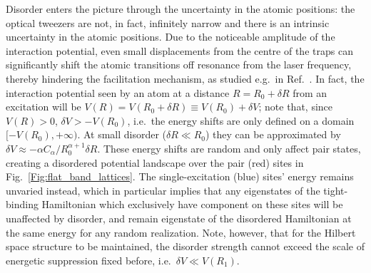 \documentclass[prl,aps,twocolumn,showpacs,superscriptaddress,longbibliography]{revtex4-1}
\begin{document}
Disorder enters the picture through the uncertainty in the atomic positions: the optical tweezers are not, in fact, infinitely narrow and there is an intrinsic uncertainty in the atomic positions. Due to the noticeable amplitude of the interaction potential, even small displacements from the centre of the traps can significantly shift the atomic transitions off resonance from the laser frequency, thereby hindering the facilitation mechanism, as studied e.g.~in Ref.~\cite{a_Marcuzzi_PRL_17}. In fact, the interaction potential seen by an atom at a distance $R = R_0 + \delta R$ from an excitation will be $V(R) = V(R_0 + \delta R) \equiv V(R_0) + \delta V$; note that, since $V(R) >0$, $\delta V > - V(R_0)$, i.e.~the energy shifts are only defined on a domain $[-V(R_0), +\infty)$. At small disorder ($\delta R \ll R_0$) they can be approximated by $\delta V \approx -\alpha C_\alpha / R_0^{\alpha + 1} \delta R$. These energy shifts are random and only affect pair states, creating a disordered potential landscape over the pair (red) sites in Fig.~\ref{Fig:flat_band_lattices}. The single-excitation (blue) sites' energy remains unvaried instead, which in particular implies that any eigenstates of the tight-binding Hamiltonian which exclusively have component on these sites will be unaffected by disorder, and remain eigenstate of the disordered Hamiltonian at the same energy for any random realization. Note, however, that for the Hilbert space structure to be maintained, the disorder strength cannot exceed the scale of energetic suppression fixed before, i.e.~$\delta V \ll V(R_1)$. 
\end{document}
